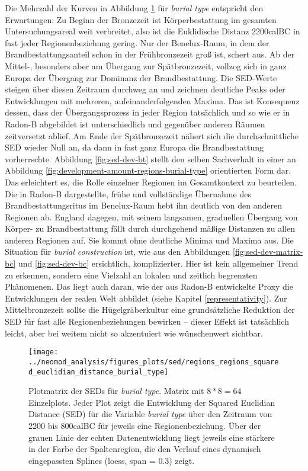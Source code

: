 \documentclass[openany,twoside,twocolumn]{book}
\begin{document}
Die Mehrzahl der Kurven in Abbildung \ref{fig:sed-dev-matrix-bt} für
\emph{burial type} entspricht den Erwartungen: Zu Beginn der Bronzezeit
ist Körperbestattung im gesamten Untersuchungsareal weit verbreitet,
also ist die Euklidische Distanz 2200calBC in fast jeder
Regionenbeziehung gering. Nur der Benelux-Raum, in dem der
Brandbestattungsanteil schon in der Frühbronzezeit groß ist, schert aus.
Ab der Mittel-, besonders aber am Übergang zur Spätbronzezeit, vollzog
sich in ganz Europa der Übergang zur Dominanz der Brandbestattung. Die
SED-Werte steigen über diesen Zeitraum durchweg an und zeichnen
deutliche Peaks oder Entwicklungen mit mehreren, aufeinanderfolgenden
Maxima. Das ist Konsequenz dessen, dass der Übergangsprozess in jeder
Region tatsächlich und so wie er in Radon-B abgebildet ist
unterschiedlich und gegenüber anderen Räumen zeitversetzt ablief. Am
Ende der Spätbronzezeit nähert sich die durchschnittliche SED wieder
Null an, da dann in fast ganz Europa die Brandbestattung vorherrschte.
Abbildung \ref{fig:sed-dev-bt} stellt den selben Sachverhalt in einer an
Abbildung \ref{fig:development-amount-regions-burial-type} orientierten
Form dar. Das erleichtert es, die Rolle einzelner Regionen im
Gesamtkontext zu beurteilen. Die in Radon-B dargestellte, frühe und
vollständige Übernahme des Brandbestattungsritus im Benelux-Raum hebt
ihn deutlich von den anderen Regionen ab. England dagegen, mit seinem
langsamen, graduellen Übergang von Körper- zu Brandbestattung fällt
durch durchgehend mäßige Distanzen zu allen anderen Regionen auf. Sie
kommt ohne deutliche Minima und Maxima aus. Die Situation für
\emph{burial construction} ist, wie aus den Abbildungen
\ref{fig:sed-dev-matrix-bc} und \ref{fig:sed-dev-bc} ersichtlich,
komplizierter. Hier ist kein allgemeiner Trend zu erkennen, sondern eine
Vielzahl an lokalen und zeitlich begrenzten Phänomenen. Das liegt auch
daran, wie der aus Radon-B entwickelte Proxy die Entwicklungen der
realen Welt abbildet (siehe Kapitel \ref{representativity}). Zur
Mittelbronzezeit sollte die Hügelgräberkultur eine grundsätzliche
Reduktion der SED für fast alle Regionenbeziehungen bewirken -- dieser
Effekt ist tatsächlich leicht, aber bei weitem nicht so akzentuiert wie
wünschenwert sichtbar.

\begin{figure}
\texttt{[image: ../neomod\_analysis/figures\_plots/sed/regions\_regions\_squared\_euclidian\_distance\_burial\_type]} \caption[Plotmatrix der SEDs für \textit{burial type}]{Plotmatrix der SEDs für \textit{burial type}. Matrix mit $8*8=64$ Einzelplots. Jeder Plot zeigt die Entwicklung der Squared Euclidian Distance (SED) für die Variable \textit{burial type} über den Zeitraum von 2200 bis 800calBC für jeweils eine Regionenbeziehung. Über der grauen Linie der echten Datenentwicklung liegt jeweils eine stärkere in der Farbe der Spaltenregion, die den Verlauf eines dynamisch eingepassten Splines (loess, span = 0.3) zeigt.}\label{fig:sed-dev-matrix-bt}
\end{figure}
\end{document}
